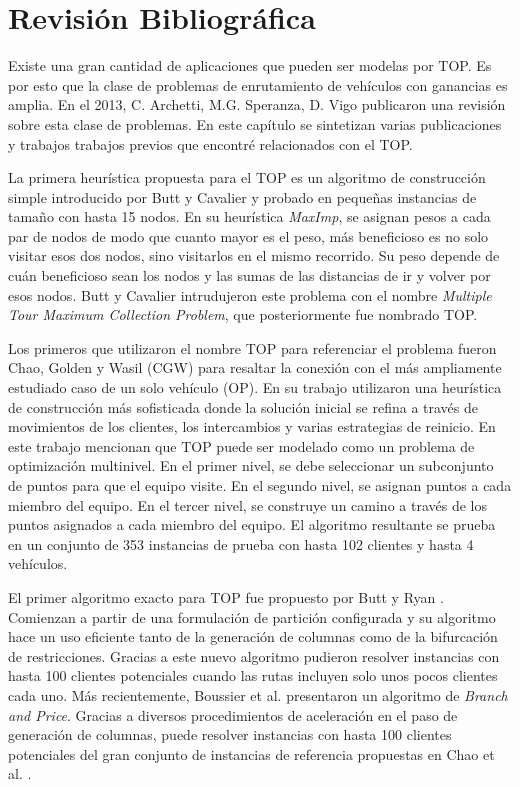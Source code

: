 

\chapter{Revisión Bibliográfica}

Existe una gran cantidad de aplicaciones que pueden ser modelas por TOP. Es por esto que la clase de problemas de enrutamiento de vehículos con ganancias es amplia. En el 2013, C. Archetti, M.G. Speranza, D. Vigo \cite{ArchettiSperanzaVigo} publicaron una revisión sobre esta clase de problemas. En este capítulo se sintetizan varias publicaciones y trabajos trabajos previos que encontré relacionados con el TOP.

\bigskip

La primera heurística propuesta para el TOP es un algoritmo de construcción simple introducido por Butt y Cavalier \cite{ButtCavalier} y probado en pequeñas instancias de tamaño con hasta 15 nodos. En su heurística \textit{MaxImp}, se asignan pesos a cada par de nodos de modo que cuanto mayor es el peso, más beneficioso es no solo visitar esos dos nodos, sino visitarlos en el mismo recorrido. Su peso depende de cuán beneficioso sean los nodos y las sumas de las distancias de ir y volver por esos nodos. Butt y Cavalier intrudujeron este problema con el nombre \textit{Multiple Tour Maximum Collection Problem}, que posteriormente fue nombrado TOP.

\bigskip

Los primeros que utilizaron el nombre TOP para referenciar el problema fueron Chao, Golden y Wasil (CGW) \cite{ChaoGoldenWasil} para resaltar la conexión con el más ampliamente estudiado caso de un solo vehículo (OP). En su trabajo utilizaron una heurística de construcción más sofisticada donde la solución inicial se refina a través de movimientos de los clientes, los intercambios y varias estrategias de reinicio. En este trabajo mencionan que TOP puede ser modelado como un problema de optimización multinivel. En el primer nivel, se debe seleccionar un subconjunto de puntos para que el equipo visite. En el segundo nivel, se asignan puntos a cada miembro del equipo. En el tercer nivel, se construye un camino a través de los puntos asignados a cada miembro del equipo. El algoritmo resultante se prueba en un conjunto de 353 instancias de prueba con hasta 102 clientes y hasta 4 vehículos.

\bigskip

El primer algoritmo exacto para TOP fue propuesto por Butt y Ryan \cite{ButtRyan}. Comienzan a partir de una formulación de partición configurada y su algoritmo hace un uso eficiente tanto de la generación de columnas como de la bifurcación de restricciones. Gracias a este nuevo algoritmo pudieron resolver instancias con hasta 100 clientes potenciales cuando las rutas incluyen solo unos pocos clientes cada uno. Más recientemente, Boussier et al. \cite{BoussierFeilletGendreau} presentaron un algoritmo de \textit{Branch and Price}. Gracias a diversos procedimientos de aceleración en el paso de generación de columnas, puede resolver instancias con hasta 100 clientes potenciales del gran conjunto de instancias de referencia propuestas en Chao et al. \cite{ChaoGoldenWasil}.


